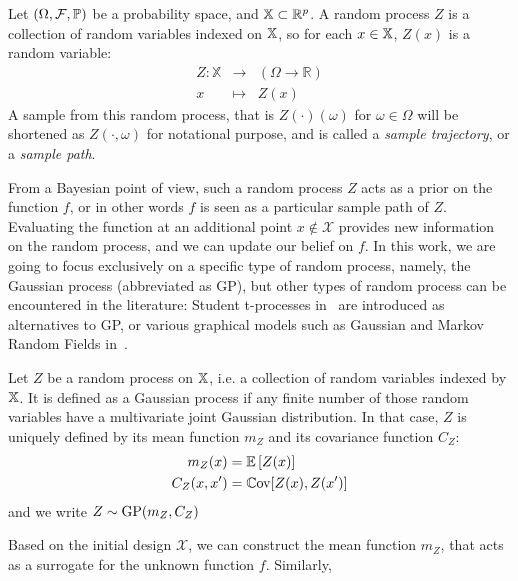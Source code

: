 \documentclass[../../Main_ManuscritThese.tex]{subfiles}
\begin{document}
\begin{definition}
  Let $(\Omega, \mathcal{F}, \mathbb{P})$ be a probability space, and $\mathbb{X}\subset \mathbb{R}^p$.
  A random process $Z$ is a collection of random variables indexed on $\mathbb{X}$, so for each $x \in \mathbb{X}$, $Z(x)$ is a random variable:
 \begin{equation}
  \begin{array}{rcl}
    Z: \mathbb{X} & \longrightarrow & \left(\Omega \rightarrow \mathbb{R} \right)\\
    x& \longmapsto & Z(x)
  \end{array}
\end{equation}
A sample from this random process, that is $Z(\cdot)(\omega)$ for $\omega \in \Omega$ will be shortened as $Z(\cdot, \omega)$ for notational purpose, and is called a \emph{sample trajectory}, or a \emph{sample path}.
\end{definition}
From a Bayesian point of view, such a random process $Z$ acts as a prior on the function $f$, or in other words $f$ is seen as a particular sample path of $Z$. Evaluating the function at an additional point $x \notin \mathcal{X}$ provides new information on the random process, and we can update our belief on $f$.
In this work, we are going to focus exclusively on a specific type of random process, namely, the Gaussian process (abbreviated as GP), but other types of random process can be encountered in the literature: Student t-processes in~\cite{shah_student-t_2014} are introduced as alternatives to GP, or various graphical models such as Gaussian and Markov Random Fields in~\cite{bishop_pattern_2006,li_markov_2009}.

\begin{definition}
  Let $Z$ be a random process on $\mathbb{X}$, i.e. a collection of random variables indexed by $\mathbb{X}$. It is defined as a Gaussian process if any finite number of those random variables have a multivariate joint Gaussian distribution.
  In that case, $Z$ is uniquely defined by its mean function $m_Z$ and its covariance function $C_Z$:
  \begin{align}
    m_Z(x) &= \mathbb{E}\left[Z(x)\right] \\
    C_Z(x, x^{\prime}) &= \mathbb{C}\mathrm{ov}[Z(x), Z(x^{\prime})]
  \end{align}
  and we write $Z \sim \operatorname{\mathrm{GP}}(m_Z, C_Z)$
\end{definition}
Based on the initial design $\mathcal{X}$, we can construct the mean function $m_Z$, that acts as a surrogate for the unknown function $f$. Similarly, 
\end{document}
